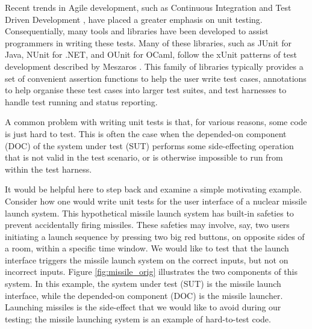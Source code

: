 \documentclass[proposal]{softeng}
\begin{document}

Recent trends in Agile development, such as Continuous Integration
\cite{humble:continuous} and Test Driven Development \cite{beck:tdd},
have placed a greater emphasis on unit testing. Consequentially, many
tools and libraries have been developed to assist programmers in
writing these tests. Many of these libraries, such as JUnit
\cite{www:junit} for Java, NUnit \cite{www:nunit} for .NET, and OUnit
\cite{www:ounit} for OCaml, follow the xUnit patterns of test
development described by Meszaros \cite{meszaros:xunit}. This family
of libraries typically provides a set of convenient assertion
functions to help the user write test cases, annotations to help
organise these test cases into larger test suites, and test harnesses
to handle test running and status reporting.

A common problem with writing unit tests is that, for various reasons,
some code is just hard to test. This is often the case when the
depended-on component (DOC) of the system under test (SUT) performs
some side-effecting operation that is not valid in the test scenario,
or is otherwise impossible to run from within the test
harness.

It would be helpful here to step back and examine a simple motivating
example. Consider how one would write unit tests for the user
interface of a nuclear missile launch system. This hypothetical
missile launch system has built-in safeties to prevent accidentally
firing missiles. These safeties may involve, say, two users initiating
a launch sequence by pressing two big red buttons, on opposite sides
of a room, within a specific time window. We would like to test that
the launch interface triggers the missile launch system on the correct
inputs, but not on incorrect inputs. Figure \ref{fig:missile_orig}
illustrates the two components of this system. In this example, the
system under test (SUT) is the missile launch interface, while the
depended-on component (DOC) is the missile launcher. Launching
missiles is the side-effect that we would like to avoid during our
testing; the missile launching system is an example of hard-to-test
code.
\end{document}
